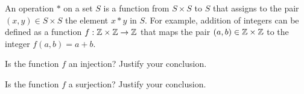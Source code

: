 \begin{comment}

\ExerciseSolution Suppose that $k$ and $m$ are natural numbers and $f(k) = f(m)$. Then
\begin{align*}
\frac{1 + (-1)^k (2k - 1)}{4} &= \frac{1 + (-1)^m (2m - 1)}{4} \\
1 + (-1)^k (2k - 1) &= 1 + (-1)^m (2m - 1) \\
(-1)^k (2k - 1) &= (-1)^m (2m - 1).
\end{align*}
Notice that $k$ and $m$ are both at least $1$, so $2k-1$ and $2m-1$ are positive. In order to have an equality, it follows that $k$ and $m$ must have the same parity. Now we consider cases.
\begin{description}
\item[$k$ and $m$ are both even:] In this case $(-1)^k = (-1)^m = 1$ and we then have $2k-1 = 2m-1$ or $k = m$. 
\item[$k$ and $m$ are both odd:] In this case $(-1)^k = (-1)^m = -1$ and we then have $-(2k-1) = -(2m-1)$ or $k = m$. 
\end{description}
Therefore, $f$ is an injection.

To show that $f$ is a surjection, let $s \in \Z$.  First notice that $f(1) = 0$, so $0$ is in the range of $f$. Again we consider cases.
\begin{description}
\item[$s$ is positive:] In this case we have 
\[f(2s) = \frac{1+(-1)^{2s}(4s-1)}{4} =  \frac{1+(4s-1)}{4} = \frac{4s}{4} = s.\]
\item[$s$ is negative:] In this case we have 
\[f(1-2s) = \frac{1+(-1)^{1-2s}(2(1-2s)-1}{4} =  \frac{1-(1-4s)}{4} = \frac{4s}{4} = s.\]
\end{description}
We conclude that $f$ is a surjection. 


\end{comment}

\item An operation $*$ on a set $S$ is a function from $S \times S$ to $S$ that assigns to the pair $(x,y) \in S \times S$ the element $x*y$ in $S$. For example, addition of integers can be defined as a function 
$f : \mathbb{Z} \times \mathbb{Z} \to \mathbb{Z}$ that maps the pair $(a,b)\in \mathbb{Z} \times \mathbb{Z}$ to the integer $f(a,b) = a+b$.
		\ba
		\item Is the function $f$ an injection?  Justify your conclusion.
                 \item Is the function $f$ a surjection?  Justify your conclusion.
		\ea

